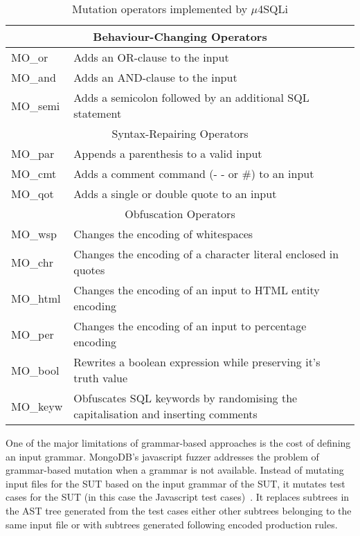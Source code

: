 \begin{table}[h]
\caption{Mutation operators implemented by $\mu$4SQLi}
\label{table:Mu4SQLI}
\begin{tabular}{|p{2cm}|p{11.5cm}|}
\hline
\multicolumn{2}{|c|}{Behaviour-Changing Operators}\\
\hline
MO\_or&Adds an OR-clause to the input\\
MO\_and&Adds an AND-clause to the input\\
MO\_semi&Adds a semicolon followed by an additional SQL statement\\
\hline
\multicolumn{2}{|c|}{Syntax-Repairing Operators}\\
\hline
MO\_par&Appends a parenthesis to a valid input\\
MO\_cmt&Adds a comment command (- - or \#) to an input\\
MO\_qot&Adds a single or double quote to an input\\
\hline
\multicolumn{2}{|c|}{Obfuscation Operators}\\
\hline
MO\_wsp&Changes the encoding of whitespaces \\
MO\_chr&Changes the encoding of a character literal enclosed in quotes\\
MO\_html&Changes the encoding of an input to HTML entity encoding\\
MO\_per&Changes the encoding of an input to percentage encoding\\
MO\_bool&Rewrites a boolean expression while preserving it's truth value\\
MO\_keyw&Obfuscates SQL keywords by randomising the capitalisation and inserting comments\\
\hline
\end{tabular}
\end{table}



One of the major limitations of grammar-based approaches is the cost of defining an input grammar. MongoDB's javascript fuzzer addresses the problem of grammar-based mutation when a grammar is not available. Instead of mutating input files for the SUT based on the input grammar of  the SUT, it mutates test cases for the SUT (in this case the Javascript test cases)~\MongoDB. It replaces subtrees in the AST tree generated from the test cases either other subtrees belonging to the same input file or with subtrees generated following encoded production rules.



